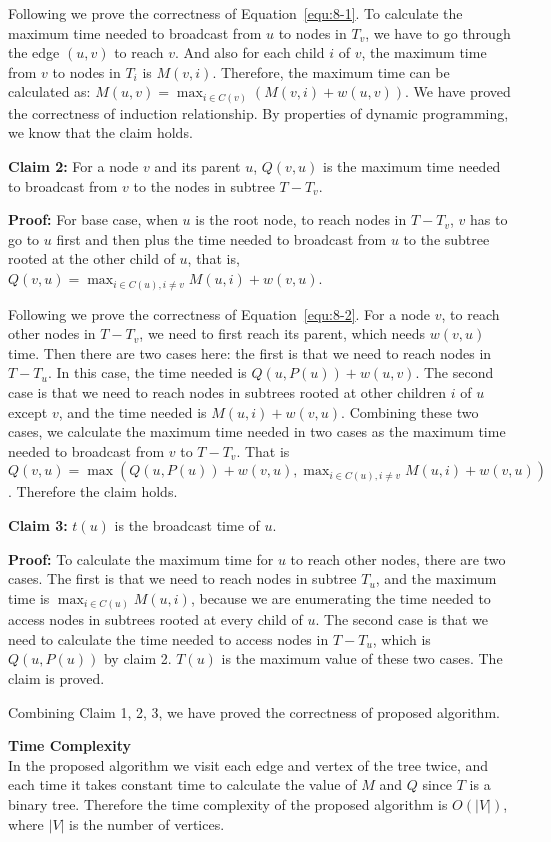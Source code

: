 \documentclass{article}
\newcommand{\Complexity}{\vspace{0.3cm} \noindent\textbf{Time Complexity} \vspace{0.2cm} \\}
\begin{document}
Following we prove the correctness of Equation~\ref{equ:8-1}. To calculate the maximum time needed
to broadcast from $u$ to nodes in $T_v$, we have to go through the edge $(u, v)$ to reach $v$. 
And also for each child $i$ of $v$, the maximum time from $v$ to nodes in $T_i$ is $M(v, i)$. Therefore, the
maximum time can be calculated as: $ M(u, v) = \max_{i \in C(v)} (M(v, i) + w(u, v))$. We have
proved the correctness of induction relationship. By properties of dynamic programming, we know that
the claim holds.

\textbf{Claim 2:}
For a node $v$ and its parent $u$, $Q(v, u)$ is the maximum time needed to broadcast from $v$ to the
nodes in subtree $T - T_v$.

\textbf{Proof:}
For base case, when $u$ is the root node, to reach nodes in $T - T_v$, $v$ has to go to $u$ first and then plus the
time needed to broadcast from $u$ to the subtree rooted at the other child of $u$, that is, 
$Q(v, u) = \max_{i \in C(u), i \neq v} M(u, i) + w(v, u)$. 

Following we prove the correctness of Equation~\ref{equ:8-2}. For a node $v$, to reach other nodes
in $T - T_v$, we need to first reach its parent, which needs $w(v, u)$ time. Then there are two
cases here: the first is that we need to reach nodes in $T - T_u$. In this case, the time needed is
$Q(u, P(u)) + w(u, v)$. The second case is that we need to reach nodes in subtrees rooted at other
children $i$ of $u$ except $v$, and the time needed is $M(u, i) + w(v, u)$. Combining these two
cases, we calculate the maximum time needed in two cases as the maximum time needed to broadcast
from $v$ to $T - T_v$. That is 
  $Q(v, u) = \max(Q(u, P(u))  + w(v, u), \max_{i \in C(u), i \neq v} M(u, i) + w(v, u))$. Therefore
  the claim holds.

\textbf{Claim 3:} $t(u)$ is the broadcast time of $u$.

\textbf{Proof:}
To calculate the maximum time for $u$ to reach other nodes, there are two cases. The first is that
we need to reach nodes in subtree $T_u$, and the maximum time is $\max_{i \in C(u)} M(u, i)$,
because we are enumerating the time needed to access nodes in subtrees rooted at every child of $u$.
The second case is that we need to calculate the time needed to access nodes in $T - T_u$, which is 
$Q(u, P(u))$ by claim 2. $T(u)$ is the maximum value of these two cases. The claim is proved.

Combining Claim 1, 2, 3, we have proved the correctness of proposed algorithm.

\Complexity
In the proposed algorithm we visit each edge and vertex of the tree twice, and each time it takes
constant time to calculate the value of $M$ and $Q$ since $T$ is a binary tree. Therefore the time
complexity of the proposed algorithm is $O(|V|)$, where $|V|$ is the number of vertices.   
\end{document}

